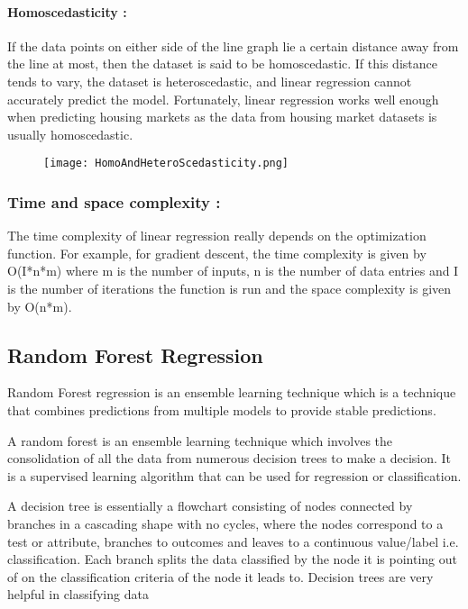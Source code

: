 \documentclass{article}
\begin{document}
\paragraph{Homoscedasticity :} If the data points on either side of the line graph lie a certain distance away from the line at most, then the dataset is said to be homoscedastic. If this distance tends to vary, the dataset is heteroscedastic, and linear regression cannot accurately predict the model. Fortunately, linear regression works well enough when predicting housing markets as the data from housing market datasets is usually  homoscedastic. 

\begin{figure}
    \centering
    \texttt{[image: HomoAndHeteroScedasticity.png]}
    \caption{}
    \label{fig:enter-label}
\end{figure}

\subsubsection{Time and space complexity : }
The time complexity of linear regression really depends on the optimization function. For example, for gradient descent, the time complexity is given by O(I*n*m) where m is the number of inputs, n is the number of data entries and I is the number of iterations the function is run and the space complexity is given by O(n*m).

\subsection{Random Forest Regression}
Random Forest regression is an ensemble learning technique which is a technique that combines predictions from multiple models to provide stable predictions.

A random forest is an ensemble learning technique which involves the consolidation of all the data from numerous decision trees to make a decision. It is a supervised learning algorithm that can be used for regression or classification.

A decision tree is essentially a flowchart consisting of nodes connected by branches in a cascading shape with no cycles, where the nodes correspond to a test or attribute, branches to outcomes and leaves to a continuous value/label i.e. classification. Each branch splits the data classified by the node it is pointing out of on the classification criteria of the node it leads to. Decision trees are very helpful in classifying data
\end{document}
